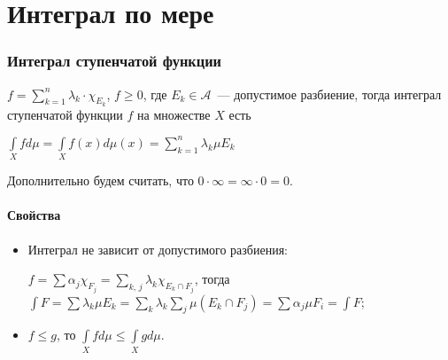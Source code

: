 \documentclass{article}
\begin{document}
\newcommand{\R}[0]{\mathbb{R}}
\newcommand{\RM}[0]{\mathbb{R}^m}
\newcommand{\dist}[0]{\mathrm{dist}}
\newcommand{\rang}[0]{\mathrm{rang} $\ $}
\newcommand{\grad}[0]{\mathrm{grad} $\ $}
\newcommand{\Lin}[0]{\mathrm{Lin} $\ $}

\tableofcontents

\newpage 

\part{Интеграл по мере}

\newpage

    \section{Интеграл ступенчатой функции}
    
        $f = \sum\limits_{k = 1}^n \lambda_k \cdot \chi_{E_k}$, $f \geqslant 0$, где $E_k \in \mathcal{A}$~--- допустимое разбиение, тогда интеграл ступенчатой функции $f$ на множестве $X$ есть
                
        $\int\limits_{X} f d \mu = \int\limits_{X} f(x) d \mu(x) = \sum\limits_{k = 1}^n \lambda_k \mu E_k$ 
        
        Дополнительно будем считать, что $0 \cdot \infty = \infty \cdot 0 = 0$.
                
        \subsection{Свойства}
                
            \begin{itemize}
                
                \item Интеграл не зависит от допустимого разбиения:
                    
                    $f = \sum \alpha_j \chi_{F_j} = \sum\limits_{k,\, j} \lambda_k \chi_{E_k \cap F_j}$, тогда $\int F = \sum \lambda_k \mu E_k = \sum\limits_{k} \lambda_k \sum\limits_j \mu (E_k \cap F_j) = \sum \alpha_j \mu F_i = \int F$;
                        
                \item $f \leqslant g$, то $\int\limits_{X} f d \mu \leqslant \int\limits_{X} g d \mu$.
                
            \end{itemize}
            
\end{document}
